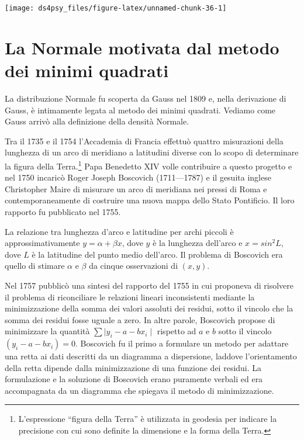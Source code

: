 \documentclass[
  11pt,
]{krantz}
\theoremstyle{definition}
\theoremstyle{definition}
\theoremstyle{definition}
\theoremstyle{definition}
\theoremstyle{remark}
\begin{document}
\begin{center}\texttt{[image: ds4psy\_files/figure-latex/unnamed-chunk-36-1]} \end{center}

\hypertarget{gauss-normale}{%
\chapter{La Normale motivata dal metodo dei minimi quadrati}\label{gauss-normale}}

La distribuzione Normale fu scoperta da Gauss nel 1809 e, nella derivazione di Gauss, è intimamente legata al metodo dei minimi quadrati. Vediamo come Gauss arrivò alla definizione della densità Normale.

Tra il 1735 e il 1754 l'Accademia di Francia effettuò quattro misurazioni della lunghezza di un arco di meridiano a latitudini diverse con lo scopo di determinare la figura della Terra.\footnote{L'espressione ``figura della Terra'' è utilizzata in geodesia per indicare la precisione con cui sono definite la dimensione e la forma della Terra.} Papa Benedetto XIV volle contribuire a questo progetto e nel 1750 incaricò Roger Joseph Boscovich (1711---1787) e il gesuita inglese Christopher Maire di misurare un arco di meridiana nei pressi di Roma e contemporaneamente di costruire una nuova mappa dello Stato Pontificio. Il loro rapporto fu pubblicato nel 1755.

La relazione tra lunghezza d'arco e latitudine per archi piccoli è approssimativamente \(y = \alpha + \beta x\), dove \(y\) è la lunghezza dell'arco e \(x = sin^2L\), dove \(L\) è la latitudine del punto medio dell'arco. Il problema di Boscovich era quello di stimare \(\alpha\) e \(\beta\) da cinque osservazioni di \((x, y)\).

Nel 1757 pubblicò una sintesi del rapporto del 1755 in cui proponeva di risolvere il problema di riconciliare le relazioni lineari inconsistenti mediante la minimizzazione della somma dei valori assoluti dei residui, sotto il vincolo che la somma dei residui fosse uguale a zero. In altre parole, Boscovich propose di minimizzare la quantità \(\sum \mid y_i - a - b x_i \mid\) rispetto ad \(a\) e \(b\) sotto il vincolo \((y_i - a - b x_i) = 0\). Boscovich fu il primo a formulare un metodo per adattare una retta ai dati descritti da un diagramma a dispersione, laddove l'orientamento della retta dipende dalla minimizzazione di una funzione dei residui. La formulazione e la soluzione di Boscovich erano puramente verbali ed era accompagnata da un diagramma che spiegava il metodo di minimizzazione.
\end{document}
